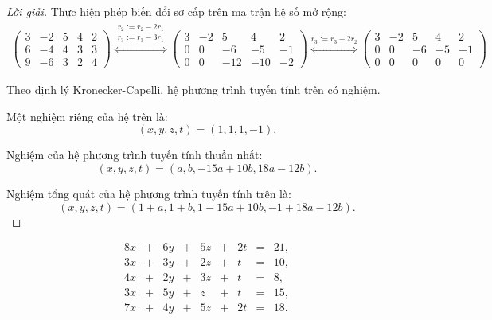 \begin{proof}[Lời giải]
    Thực hiện phép biến đổi sơ cấp trên ma trận hệ số mở rộng:
    \begingroup{}
    \allowdisplaybreaks{}
    \begin{gather*}
        \left(
        \begin{array}{cccc|c}
                3 & -2 & 5 & 4 & 2 \\
                6 & -4 & 4 & 3 & 3 \\
                9 & -6 & 3 & 2 & 4
            \end{array}
        \right)
        \stackrel{
            \substack{
                r_{2}:= r_{2} {-} 2r_{1} \\
                r_{3}:= r_{3} {-} 3r_{1}
            }
        }{\Longleftrightarrow}
        \left(\begin{array}{cccc|c}
                3 & -2 & 5   & 4   & 2  \\
                0 & 0  & -6  & -5  & -1 \\
                0 & 0  & -12 & -10 & -2
            \end{array}
        \right)
        \stackrel{
            r_{3}:= r_{3} {-} 2r_{2}
        }{\Longleftrightarrow}
        \left(\begin{array}{cccc|c}
                3 & -2 & 5  & 4  & 2  \\
                0 & 0  & -6 & -5 & -1 \\
                0 & 0  & 0  & 0  & 0
            \end{array}
        \right)
    \end{gather*}
    \endgroup{}
    
    Theo định lý Kronecker-Capelli, hệ phương trình tuyến tính trên có nghiệm.
    
    Một nghiệm riêng của hệ trên là:
    \[
        (x, y, z, t) = (1, 1, 1, -1).
    \]
    
    Nghiệm của hệ phương trình tuyến tính thuần nhất:
    \[
        (x, y, z, t) = (a, b, -15a + 10b, 18a - 12b).
    \]
    
    Nghiệm tổng quát của hệ phương trình tuyến tính trên là:
    \[
        (x, y, z, t) = (1 + a, 1 + b, 1 - 15a + 10b, -1 + 18a - 12b).
    \]
\end{proof}

\begin{exercise}
    \[
        \begin{array}{ccccccccc}
            8x & + & 6y & + & 5z & + & 2t & = & 21, \\
            3x & + & 3y & + & 2z & + & t  & = & 10, \\
            4x & + & 2y & + & 3z & + & t  & = & 8,  \\
            3x & + & 5y & + & z  & + & t  & = & 15, \\
            7x & + & 4y & + & 5z & + & 2t & = & 18.
        \end{array}
    \]
\end{exercise}

